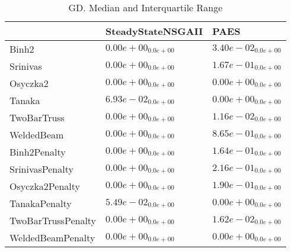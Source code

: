 \documentclass{article}
\begin{document}
\begin{table}
\caption{GD. Median and Interquartile Range}
\label{table: GD}
\centering
\begin{scriptsize}
\begin{tabular}{lll}
\hline & SteadyStateNSGAII &  PAES\\
\hline 
Binh2 & \cellcolor{gray95}$  0.00e+00_{ 0.0e+00}$ & \cellcolor{gray25}$  3.40e-02_{ 0.0e+00}$ \\
Srinivas & \cellcolor{gray95}$  0.00e+00_{ 0.0e+00}$ & \cellcolor{gray25}$  1.67e-01_{ 0.0e+00}$ \\
Osyczka2 & \cellcolor{gray95}$  0.00e+00_{ 0.0e+00}$ & \cellcolor{gray25}$  0.00e+00_{ 0.0e+00}$ \\
Tanaka & \cellcolor{gray25}$  6.93e-02_{ 0.0e+00}$ & \cellcolor{gray95}$  0.00e+00_{ 0.0e+00}$ \\
TwoBarTruss & \cellcolor{gray95}$  0.00e+00_{ 0.0e+00}$ & \cellcolor{gray25}$  1.16e-02_{ 0.0e+00}$ \\
WeldedBeam & \cellcolor{gray95}$  0.00e+00_{ 0.0e+00}$ & \cellcolor{gray25}$  8.65e-01_{ 0.0e+00}$ \\
Binh2Penalty & \cellcolor{gray95}$  0.00e+00_{ 0.0e+00}$ & \cellcolor{gray25}$  1.64e-01_{ 0.0e+00}$ \\
SrinivasPenalty & \cellcolor{gray95}$  0.00e+00_{ 0.0e+00}$ & \cellcolor{gray25}$  2.16e-01_{ 0.0e+00}$ \\
Osyczka2Penalty & \cellcolor{gray95}$  0.00e+00_{ 0.0e+00}$ & \cellcolor{gray25}$  1.90e-01_{ 0.0e+00}$ \\
TanakaPenalty & \cellcolor{gray25}$  5.49e-02_{ 0.0e+00}$ & \cellcolor{gray95}$  0.00e+00_{ 0.0e+00}$ \\
TwoBarTrussPenalty & \cellcolor{gray95}$  0.00e+00_{ 0.0e+00}$ & \cellcolor{gray25}$  1.62e-02_{ 0.0e+00}$ \\
WeldedBeamPenalty & \cellcolor{gray95}$  0.00e+00_{ 0.0e+00}$ & \cellcolor{gray25}$  0.00e+00_{ 0.0e+00}$ \\
\hline
\end{tabular}
\end{scriptsize}
\end{table}
\end{document}
